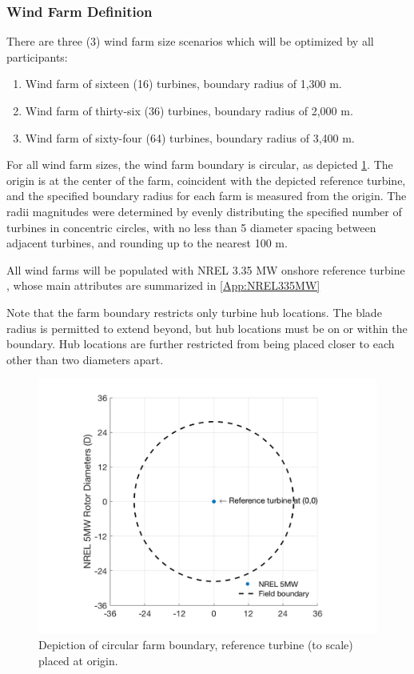 \documentclass[12pt]{article}
\begin{document}
\subsubsection{Wind Farm Definition}\label{Sec:OptWindFarm}
There are three (3) wind farm size scenarios which will be optimized by all participants:

        \begin{enumerate}
            \item Wind farm of sixteen (16) turbines,
                boundary radius of 1,300 m.
            \item Wind farm of thirty-six (36) turbines,
                boundary radius of 2,000 m.
            \item Wind farm of sixty-four (64) turbines,
                boundary radius of 3,400 m.
        \end{enumerate}
    
    For all wind farm sizes, the wind farm boundary is circular, as depicted \cref{fig:EmptyFarm}. The origin is at the center of the farm, coincident with the depicted reference turbine, and the specified boundary radius for each farm is measured from the origin. The radii magnitudes were determined by evenly distributing the specified number of turbines in concentric circles, with no less than 5 diameter spacing between adjacent turbines, and rounding up to the nearest 100 m.
    
    All wind farms will be populated with NREL 3.35 MW onshore reference turbine \cite{NREL335MW}, whose main attributes are summarized in \cref{App:NREL335MW}
    
    Note that the farm boundary restricts only turbine hub locations. The blade radius is permitted to extend beyond, but hub locations must be on or within the boundary. Hub locations are further restricted from being placed closer to each other than two diameters apart.
    
    \begin{figure}[H]
        \centering
        \includegraphics[width=.65\linewidth]{EmptyOptField.png}
        \caption{Depiction of circular farm boundary, reference turbine (to scale) placed at origin.}
        \label{fig:EmptyFarm}
    \end{figure}
    
\end{document}
